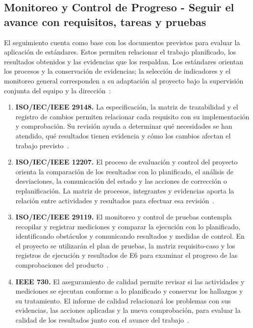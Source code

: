 \subsection{Monitoreo y Control de Progreso - Seguir el avance con requisitos, tareas y pruebas}\label{sec:spmp-10-2}
El seguimiento cuenta como base con los documentos previstos para evaluar la aplicación de estándares. Estos permiten relacionar el trabajo planificado, los resultados obtenidos y las evidencias que los respaldan. Los estándares orientan los procesos y la conservación de evidencias; la selección de indicadores y el monitoreo general corresponden a su adaptación al proyecto bajo la supervisión conjunta del equipo y la dirección~\cite{adaptacion2026,std29148,std12207,std29119p2,ieee730}:
\begin{enumerate}
\item \textbf{ISO/IEC/IEEE 29148.} La especificación, la matriz de trazabilidad y el registro de cambios permiten relacionar cada requisito con su implementación y comprobación. Su revisión ayuda a determinar qué necesidades se han atendido, qué resultados tienen evidencia y cómo los cambios afectan el trabajo previsto~\cite{std29148}.
\item \textbf{ISO/IEC/IEEE 12207.} El proceso de evaluación y control del proyecto orienta la comparación de los resultados con lo planificado, el análisis de desviaciones, la comunicación del estado y las acciones de corrección o replanificación. La matriz de procesos, integrantes y evidencias aporta la relación entre actividades y resultados para efectuar esa revisión~\cite{adaptacion2026,std12207}.
\item \textbf{ISO/IEC/IEEE 29119.} El monitoreo y control de pruebas contempla recopilar y registrar mediciones y comparar la ejecución con lo planificado, identificando obstáculos y comunicando resultados y medidas de control. En el proyecto se utilizarán el plan de pruebas, la matriz requisito-caso y los registros de ejecución y resultados de E6 para examinar el progreso de las comprobaciones del producto~\cite{adaptacion2026,std29119p2,std29119p3}.
\item \textbf{IEEE 730.} El aseguramiento de calidad permite revisar si las actividades y mediciones se ejecutan conforme a lo planificado y conservar los hallazgos y su tratamiento. El informe de calidad relacionará los problemas con sus evidencias, las acciones aplicadas y la nueva comprobación, para evaluar la calidad de los resultados junto con el avance del trabajo~\cite{adaptacion2026,ieee730}.
\end{enumerate}

